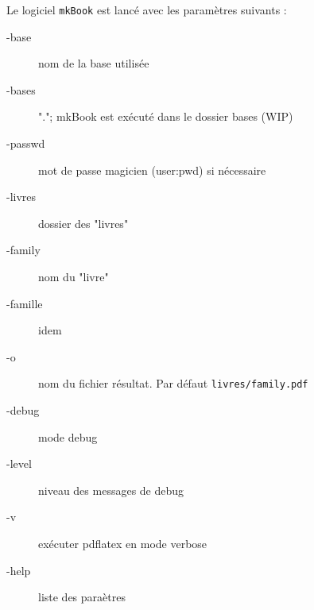 Le logiciel \verb|mkBook| est lancé avec les paramètres suivants :
\begin{description}
\item[-base] nom de la base utilisée
\item[-bases] "."; mkBook est exécuté dans le dossier bases (WIP)
\item[-passwd] mot de passe magicien (user:pwd) si nécessaire
\item[-livres] dossier des "livres"
\item[-family] nom du "livre"
\item[-famille] idem
\item[-o] nom du fichier résultat. Par défaut \verb|livres/family.pdf|
\item[-debug] mode debug
\item[-level] niveau des messages de debug
\item[-v] exécuter pdflatex en mode verbose
\item[-help] liste des paraètres
\end{description}

